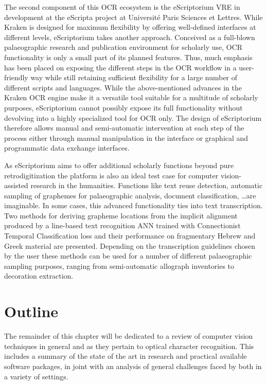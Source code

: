The second component of this OCR ecosystem is the eScriptorium VRE in
development at the eScripta project at Université Paris Sciences et Lettres.
While Kraken is designed for maximum flexibility by offering well-defined
interfaces at different levels, eScriptorium takes another approach. Conceived
as a full-blown palaeographic research and publication environment for
scholarly use, OCR functionality is only a small part of its planned features.
Thus, much emphasis has been placed on exposing the different steps in the OCR
workflow in a user-friendly way while still retaining sufficient flexibility
for a large number of different scripts and languages. While the
above-mentioned advances in the Kraken OCR engine make it a versatile tool
suitable for a multitude of scholarly purposes, eScriptorium cannot possibly
expose its full functionality without devolving into a highly specialized tool
for OCR only. The design of eScriptorium therefore allows manual and
semi-automatic intervention at each step of the process either through manual
manipulation in the interface or graphical and programmatic data exchange
interfaces. 

As eScriptorium aims to offer additional scholarly functions beyond pure
retrodigitization the platform is also an ideal test case for computer
vision-assisted research in the humanities. Functions like text reuse
detection, automatic sampling of graphemes for palaeographic analysis, document
classification, \dots are imaginable. In some cases, this advanced
functionality ties into text transcription. Two methods for deriving grapheme
locations from the implicit alignment produced by a line-based text recognition
ANN trained with Connectionist Temporal Classification loss and their
performance on fragmentary Hebrew and Greek material are presented. Depending
on the transcription guidelines chosen by the user these methods can be used
for a number of different palaeographic sampling purposes, ranging from
semi-automatic allograph inventories to decoration extraction.

\section{Outline}

The remainder of this chapter will be dedicated to a review of computer vision
techniques in general and as they pertain to optical character recognition.
This includes a summary of the state of the art in research and practical
available software packages, in joint with an analysis of general challenges
faced by both in a variety of settings.

